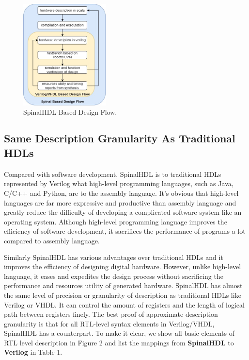 \documentclass{article}
\begin{document}
\begin{figure}[hbt]
\centering
\includegraphics[width=0.4\textwidth]{design_flow.jpg}
\caption{\label{fig:design_flow}SpinalHDL-Based Design Flow.}
\end{figure}


\subsection{Same Description Granularity As Traditional HDLs}
\paragraph{}
Compared with software development, SpinalHDL is to traditional HDLs represented by Verilog what high-level programming languages, such as Java, C/C++ and Python, are to the assembly language. It’s obvious that high-level languages are far more expressive and productive than assembly language and greatly reduce the difficulty of developing a complicated software system like an operating system. Although high-level programming language improves the efficiency of software development, it sacrifices the performance of programs a lot compared to assembly language. 

Similarly SpinalHDL has various advantages over traditional HDLs and it improves the efficiency of designing digital hardware. However, unlike high-level language, it eases and expedites the design process without sacrificing the performance and resources utility of generated hardware. SpinalHDL has almost the same level of precision or granularity of description as traditional HDLs like Verilog or VHDL. It can control the amount of registers and the length of logical path between registers finely. The best proof of approximate description granularity is that for all RTL-level syntax elements in Verilog/VHDL, SpinalHDL has a counterpart. To make it clear, we show all basic elements of RTL level description in Figure 2 and list the mappings from \textbf{SpinalHDL} to \textbf{Verilog} in Table 1.
\end{document}
